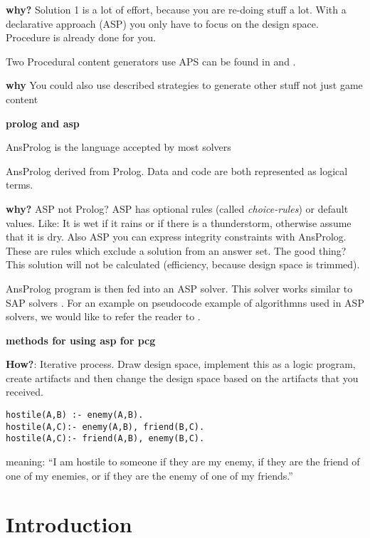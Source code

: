 \documentclass[runningheads]{llncs}
\begin{document}
\begin{list}
    \item \textbf{why?} Solution 1 is a lot of effort, because you are re-doing stuff a lot. With a declarative approach (ASP) you only have to focus on the design space. Procedure is already done for you.
    \item Two Procedural content generators use APS can be found in \cite{smith2010ludocore} and \cite{smith2010variations}.
    \item \textbf{why} You could also use described strategies to generate other stuff not just game content
    \item \textbf{prolog and asp}
    \item AnsProlog is the language accepted by most solvers \cite{baral2003knowledge}
    \item AnsProlog derived from Prolog. Data and code are both represented as logical terms. 
    \item \textbf{why?} ASP not Prolog? ASP has optional rules (called \textit{choice-rules}) or default values. Like: It is wet if it rains or if there is a thunderstorm, otherwise assume that it is dry. Also ASP you can express integrity constraints with AnsProlog. These are rules which exclude a solution from an answer set. The good thing? This solution will not be calculated (efficiency, because design space is trimmed).
    \item AnsProlog program is then fed into an ASP solver. This solver works similar to SAP solvers \cite{lin2004assat}. For an example on pseudocode example of algorithmns used in ASP solvers, we would like to refer the reader to \cite[p.~221]{russel}.
    \item \textbf{methods for using asp for pcg}
    \item \textbf{How?}: Iterative process. Draw design space, implement this as a logic program, create artifacts and then change the design space based on the artifacts that you received.
\end{list}



\begin{verbatim}
hostile(A,B) :- enemy(A,B).
hostile(A,C):- enemy(A,B), friend(B,C).
hostile(A,C):- friend(A,B), enemy(B,C).
\end{verbatim}

meaning: ``I am hostile to someone if they are my enemy, if they are the friend of one of my enemies, or if they are the enemy of one of my friends.''

\section{Introduction} \label{sec:introduction}
\end{document}
